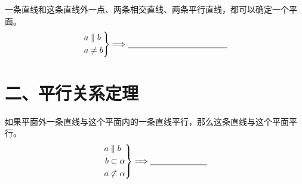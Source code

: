 \documentclass{exam-zh}
\begin{document}

\begin{problem}[points=5]
  \noindent
  \begin{minipage}[t]{\dimexpr\linewidth-55mm-6mm\relax}
    \vspace{0pt}
    一条直线和这条直线外一点、两条相交直线、两条平行直线，都可以确定一个平面。
\[
\left.
\begin{aligned}
a&\parallel b\\
a&\ne b
\end{aligned}
\right\}
\Longrightarrow
\underline{\hspace{42mm}}
\]


  \end{minipage}\hfill
  \begin{diagramcoltikz}{55mm}{}
  }
  \end{diagramcoltikz}
  \par\medskip
\end{problem}


\section*{二、平行关系定理}


\begin{problem}[points=5]
  \noindent
  \begin{minipage}[t]{\dimexpr\linewidth-55mm-6mm\relax}
    \vspace{0pt}
    如果平面外一条直线与这个平面内的一条直线平行，那么这条直线与这个平面平行。
\[
\left.
\begin{aligned}
a&\parallel b\\
b&\subset\alpha\\
a&\not\subset\alpha
\end{aligned}
\right\}
\Longrightarrow
\underline{\hspace{24mm}}
\]


  \end{minipage}\hfill
  \begin{diagramcoltikz}{55mm}{}
  }
  \end{diagramcoltikz}
  \par\medskip
\end{problem}


\end{document}
